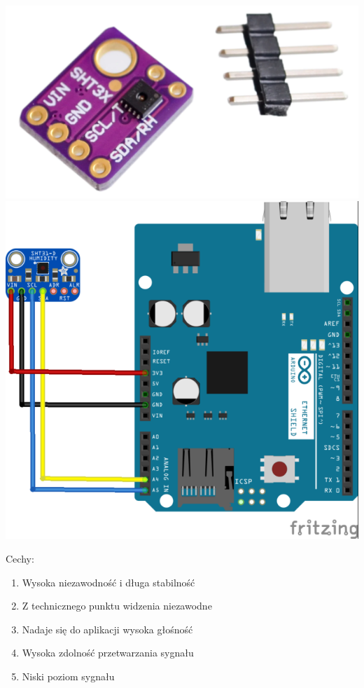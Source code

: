 \documentclass{classrep}
\begin{document}
\begin{center}
\includegraphics[scale=0.5]{SHT31}\\
\includegraphics[scale=1.0]{SHT31-Arduino-Uno}
\end{center}

Cechy:
\begin{enumerate}
  \item Wysoka niezawodność i długa stabilność
  \item Z technicznego punktu widzenia niezawodne
  \item Nadaje się do aplikacji wysoka głośność
  \item Wysoka zdolność przetwarzania sygnału
  \item Niski poziom sygnału\\
\end{enumerate}
\end{document}
